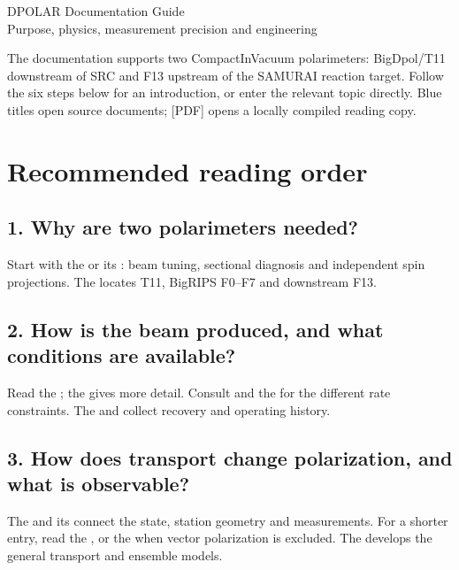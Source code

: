 \documentclass[11pt,a4paper]{article}
\begin{document}
\begin{center}
{\LARGE\sffamily\color{ink}DPOLAR Documentation Guide}\\[6pt]
Purpose, physics, measurement precision and engineering
\end{center}
The documentation supports two CompactInVacuum polarimeters: BigDpol/T11 downstream of SRC and F13 upstream of the SAMURAI reaction target. Follow the six steps below for an introduction, or enter the relevant topic directly. Blue titles open source documents; [PDF] opens a locally compiled reading copy.

\section{Recommended reading order}
\subsection*{1. Why are two polarimeters needed?}
Start with the  or its : beam tuning, sectional diagnosis and independent spin projections. The  locates T11, BigRIPS F0--F7 and downstream F13.

\subsection*{2. How is the beam produced, and what conditions are available?}
Read the ; the  gives more detail. Consult  and the  for the different rate constraints. The  and  collect recovery and operating history.

\subsection*{3. How does transport change polarization, and what is observable?}
The  and its  connect the state, station geometry and measurements. For a shorter entry, read the , or the  when vector polarization is excluded. The  develops the general transport and ensemble models.
\end{document}

